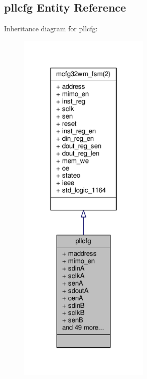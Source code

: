 \subsection{pllcfg Entity Reference}
\label{classpllcfg}


Inheritance diagram for pllcfg\+:\nopagebreak
\begin{figure}[H]
\begin{center}
\leavevmode
\includegraphics[width=178pt]{d4/d15/classpllcfg__inherit__graph}
\end{center}
\end{figure}



